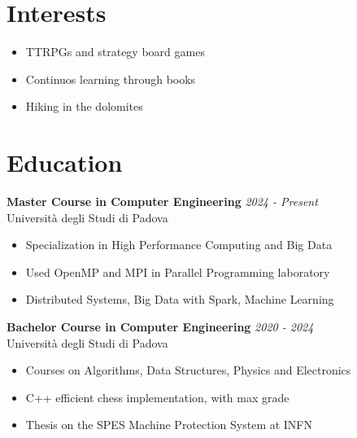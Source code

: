 \documentclass[a4paper,10pt]{article}
\begin{document}
\begin{minipage}[t]{0.33\textwidth}
    \section*{Interests}
        \begin{itemize}[left=0.2cm, label={\textbullet}]
            \item TTRPGs and strategy board games
            \item Continuos learning through books
            \item Hiking in the dolomites
        \end{itemize}

\end{minipage}
\hfill
\begin{minipage}[t]{0.58\textwidth}
    \section*{Education}
        \textbf{Master Course in Computer Engineering} \hfill \textit{2024 - Present} \\
        Università degli Studi di Padova %
        \vspace{0.1cm}
        \begin{itemize}[left=0.2cm, label={\textbullet}, itemsep=0cm]
            \item Specialization in High Performance Computing and Big Data
            \item Used OpenMP and MPI in Parallel Programming laboratory
            \item Distributed Systems, Big Data with Spark, Machine Learning
        \end{itemize}
        \vspace{0.2cm}

        \textbf{Bachelor Course in Computer Engineering}  \hfill \textit{2020 - 2024} \\
        Università degli Studi di Padova %
        \vspace{-0.1cm}
        \begin{itemize}[left=0.2cm, label={\textbullet}, itemsep=0cm]
            \item Courses on Algorithms, Data Structures, Physics and Electronics
            \item C++ efficient chess implementation, with max grade
            \item Thesis on the SPES Machine Protection System at INFN
        \end{itemize}
        \vspace{0.2cm}


\end{minipage}
\end{document}
